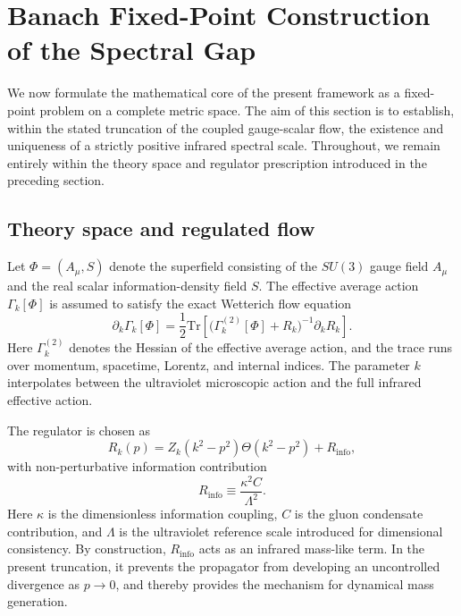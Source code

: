 
\section{Banach Fixed-Point Construction of the Spectral Gap}
\label{sec:banach_construction}

We now formulate the mathematical core of the present framework as a fixed-point problem on a complete metric space. The aim of this section is to establish, within the stated truncation of the coupled gauge-scalar flow, the existence and uniqueness of a strictly positive infrared spectral scale. Throughout, we remain entirely within the theory space and regulator prescription introduced in the preceding section.

\subsection{Theory space and regulated flow}

Let \(\Phi=(A_\mu,S)\) denote the superfield consisting of the \(SU(3)\) gauge field \(A_\mu\) and the real scalar information-density field \(S\). The effective average action \(\Gamma_k[\Phi]\) is assumed to satisfy the exact Wetterich flow equation
\begin{equation}
\partial_k \Gamma_k[\Phi]
=
\frac{1}{2}\mathrm{Tr}\!\left[
\bigl(\Gamma_k^{(2)}[\Phi]+R_k\bigr)^{-1}\partial_k R_k
\right].
\label{eq:wetterich_flow}
\end{equation}
Here \(\Gamma_k^{(2)}\) denotes the Hessian of the effective average action, and the trace runs over momentum, spacetime, Lorentz, and internal indices. The parameter \(k\) interpolates between the ultraviolet microscopic action and the full infrared effective action.

The regulator is chosen as
\begin{equation}
R_k(p)= Z_k (k^2-p^2)\Theta(k^2-p^2)+R_{\mathrm{info}},
\label{eq:regulator_def}
\end{equation}
with non-perturbative information contribution
\begin{equation}
R_{\mathrm{info}} \equiv \frac{\kappa^2 C}{\Lambda^2}.
\label{eq:r_info_def}
\end{equation}
Here \(\kappa\) is the dimensionless information coupling, \(C\) is the gluon condensate contribution, and \(\Lambda\) is the ultraviolet reference scale introduced for dimensional consistency. By construction, \(R_{\mathrm{info}}\) acts as an infrared mass-like term. In the present truncation, it prevents the propagator from developing an uncontrolled divergence as \(p\to 0\), and thereby provides the mechanism for dynamical mass generation.

